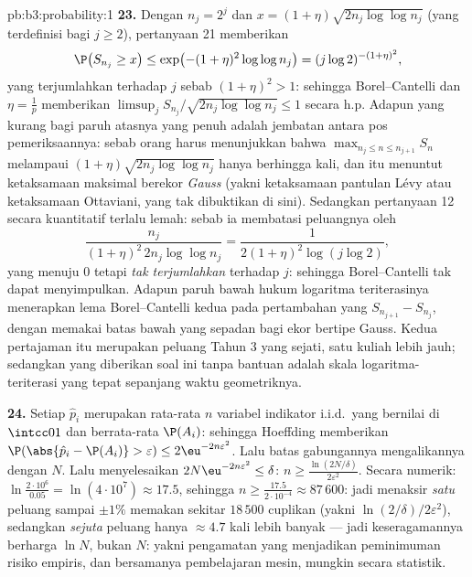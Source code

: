 \begin{solution}{pb:b3:probability:1}
\textbf{23.} Dengan $n_j = 2^j$ dan $x = (1 +
\eta)\sqrt{2n_j\log\log n_j}$ (yang terdefinisi bagi $j \geq 2$),
pertanyaan 21 memberikan
\[
\P\bigl(S_{n_j} \geq x\bigr) \leq \exp\bigl(-(1 +
\eta)^2\log\log n_j\bigr) = (j\log 2)^{-(1+\eta)^2},
\]
yang terjumlahkan terhadap $j$ sebab $(1 + \eta)^2 > 1$: sehingga Borel--Cantelli
dan $\eta = \frac1p$ memberikan $\limsup_jS_{n_j}/\sqrt{2n_j
\log\log n_j} \leq 1$ secara h.p. Adapun yang kurang bagi paruh atasnya
yang penuh adalah jembatan antara pos pemeriksaannya: sebab orang harus
menunjukkan bahwa $\max_{n_j\leq n\leq n_{j+1}}S_n$ melampaui
$(1+\eta)\sqrt{2n_j\log\log n_j}$ hanya berhingga kali,
dan itu menuntut ketaksamaan maksimal berekor \emph{Gauss}
(yakni ketaksamaan pantulan Lévy atau ketaksamaan Ottaviani,
yang tak dibuktikan di sini). Sedangkan pertanyaan 12 secara kuantitatif
terlalu lemah: sebab ia membatasi peluangnya oleh
\[
\frac{n_j}{(1+\eta)^2\,2n_j\log\log n_j}
= \frac{1}{2(1+\eta)^2\log(j\log2)},
\]
yang menuju $0$ tetapi \emph{tak terjumlahkan} terhadap $j$:
sehingga Borel--Cantelli tak dapat menyimpulkan. Adapun paruh bawah hukum
logaritma teriterasinya menerapkan lema Borel--Cantelli
kedua pada pertambahan yang 
$S_{n_{j+1}} - S_{n_j}$, dengan memakai batas bawah yang sepadan bagi
ekor bertipe Gauss. Kedua pertajaman itu merupakan peluang Tahun 3
yang sejati, satu kuliah lebih jauh; sedangkan yang diberikan soal ini
tanpa bantuan adalah skala logaritma-teriterasi yang tepat
sepanjang waktu geometriknya.

\textbf{24.} Setiap $\hat p_i$ merupakan rata-rata $n$ variabel
indikator i.i.d.\ yang bernilai di $\intcc01$ dan berrata-rata
$\P(A_i)$: sehingga Hoeffding memberikan $\P(\abs{\hat p_i - \P(A_i)} >
\varepsilon) \leq 2\eu^{-2n\varepsilon^2}$. Lalu batas gabungannya
mengalikannya dengan $N$. Lalu menyelesaikan $2N\eu^{-2n\varepsilon^2} \leq
\delta$: $n \geq \frac{\ln(2N/\delta)}{2\varepsilon^2}$.
Secara numerik: $\ln\frac{2\cdot10^6}{0.05} =
\ln(4\cdot10^7) \approx 17.5$, sehingga $n \geq
\frac{17.5}{2\cdot10^{-4}} \approx 87\,600$: jadi menaksir
\emph{satu} peluang sampai $\pm1\%$ memakan sekitar $18\,500$
cuplikan (yakni $\ln(2/\delta)/2\varepsilon^2$), sedangkan
\emph{sejuta} peluang hanya $\approx 4.7$ kali lebih banyak
--- jadi keseragamannya berharga $\ln N$, bukan $N$: yakni pengamatan yang
menjadikan peminimuman risiko empiris, dan bersamanya pembelajaran
mesin, mungkin secara statistik.


\end{solution}
